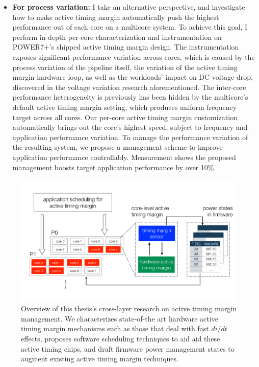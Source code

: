 \begin{itemize}
\item \textbf{For process variation:} I take an alternative perspective, and investigate how to make active timing margin automatically push the highest performance out of each core on a multicore system. To achieve this goal, I perform in-depth per-core characterization and instrumentation on POWER7+'s shipped active timing margin design. The instrumentation exposes significant performance variation across cores, which is caused by the process variation of the pipeline itself, the variation of the active timing margin hardware loop, as well as the workloads' impact on DC voltage drop, discovered in the voltage variation research aforementioned. The inter-core performance heterogeneity is previously has been hidden by the multicore's default active timing margin setting, which produces
uniform frequency target across all cores. Our per-core active timing margin customization automatically brings out the core's highest speed, subject to frequency and application performance variation. To manage the performance variation of the resulting system, we propose a management scheme to improve application performance controllably. Measurement shows the proposed management boosts target application performance by over 10\%.

\end{itemize}

\begin{figure}
  \centering
  \includegraphics[trim=0 0 0 0, clip, width=\columnwidth]{graphs/intro/sys-overview.pdf}
  \caption{Overview of this thesis's cross-layer research on active timing margin management. We characterizes state-of-the art hardware active timing margin mechanisms such as those that deal with fast $di/dt$ effects, proposes software scheduling techniques to aid aid these active timing chips, and draft firmware power management states to augment existing active timing margin techniques.}
  \label{fig:framework}
\end{figure}

